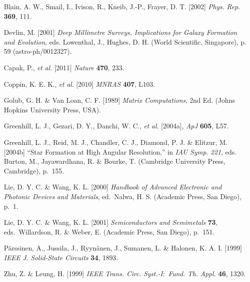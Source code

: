 \documentclass{ws-jai}
\begin{document}
\begin{thebibliography}{9}

 Blain, A. W., Smail, I., Ivison, R., Kneib, J.-P., Frayer, D. T. [2002] {\it Phys. Rep.} {\bf 369}, 111.

 Devlin, M. [2001]  {\it Deep Millimetre Surveys, Implications for Galaxy Formation and Evolution}, eds. Lowenthal, J., Hughes, D. H. (World Scientific, Singapore), p. 59 (astro-ph/0012327).

 Capak, P., {\it et al.} [2011] {\it Nature} {\bf 470}, 233.

 Coppin, K. E. K., {\it et al.} [2010] {\it MNRAS} {\bf 407}, L103.

 Golub, G. H. \& Van Loan, C. F. [1989] {\it Matrix Computations}, 2nd Ed. (Johns Hopkins University Press, USA).

 Greenhill, L. J., Gezari, D. Y., Danchi, W. C., {\it et al.} [2004a], {\it ApJ\/} {\bf 605}, L57.

 Greenhill, L. J., Reid, M. J., Chandler, C. J., Diamond, P. J. \& Elitzur, M. [2004b] ``Star Formation at High Angular Resolution,'' in {\it IAU Symp. 221}, eds. Burton, M., Jayawardhana, R. \& Bourke, T. (Cambridge University Press, Cambridge), p.~155.

 Lie, D. Y. C. \& Wang, K. L. [2000]
{\it Handbook of Advanced Electronic and Photonic Devices and
Materials}, ed.~Nalwa, H. S. (Academic Press, San Diego), p.~1.

 Lie, D. Y. C. \& Wang, K. L. [2001]
{\it Semiconductors and Semimetals} {\bf 73}, eds.~Willardson, R.
\& Weber, E. (Academic Press, San Diego), p.~151.

 P\"arssinen, A., Jussila, J., Ryyn\"anen, J.,
Sumanen, L. \& Halonen, K. A. I. [1999] {\it IEEE J. Solid-State
Circuits} {\bf 34}, 1893.

Zhu, Z. \& Leung, H. [1999] {\it IEEE Trans. Circ. Syst.-I\/$:$ Fund. Th. Appl.} {\bf 46},
1320.

\end{thebibliography}
\end{document}
